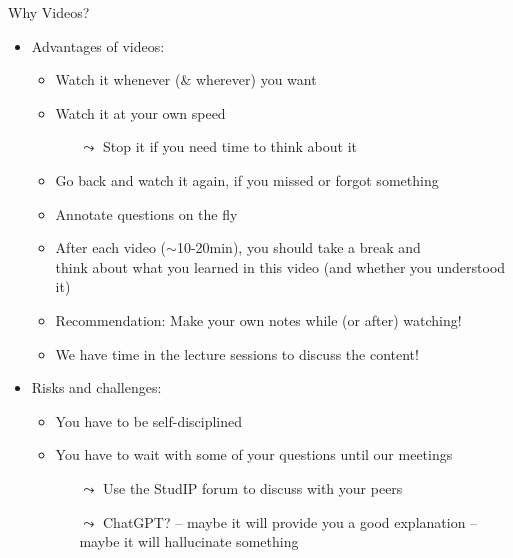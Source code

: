\documentclass[aspectratio=169,handout]{../latex_main/tntbeamer}  %
\begin{document}
\begin{frame}[c]{Why Videos?}


\begin{itemize}
  \item Advantages of videos:
  \begin{itemize}
      \item Watch it whenever (\& wherever) you want
      \item Watch it at your own speed
      \begin{itemize}
          \item[$\leadsto$] Stop it if you need time to think about it
      \end{itemize}
      \pause
      \item Go back and watch it again, if you missed or forgot something
      \item Annotate questions on the fly
      \pause
      \item After each video ($\sim$10-20min), you should take a break and\\ think about what you learned in this video (and whether you understood it)
      \pause
      \item \alert{Recommendation:} Make your own notes while (or after) watching!
      \pause
      \item \alert{We have time in the lecture sessions to discuss the content!}
  \end{itemize}
  \medskip
  \pause
  \item Risks and challenges:
  \begin{itemize}
      \item You have to be self-disciplined 
      \item You have to wait with some of your questions until our meetings
      \begin{itemize}
          \item[$\leadsto$] Use the StudIP forum to discuss with your peers
          \item[$\leadsto$] ChatGPT? -- \alert{maybe} it will provide you a good explanation -- maybe it will hallucinate something
      \end{itemize}
  \end{itemize}
\end{itemize}

\end{frame}
\end{document}
